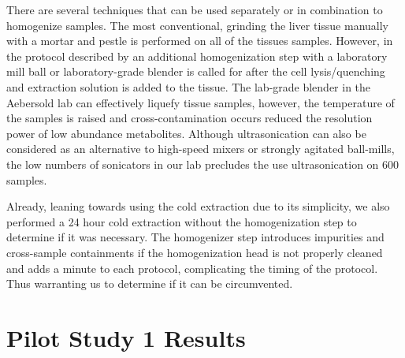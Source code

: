\documentclass[a4paper,11pt,twoside]{book}
\begin{document}
	There are several techniques that can be used separately or in combination to homogenize samples. The most conventional, grinding the liver tissue manually with a mortar and pestle is performed on all of the tissues samples. However, in the protocol described by \citeauthor{Williams2016SystemsFunction} an additional homogenization step with a laboratory mill ball or laboratory-grade blender is called for after the cell lysis/quenching and extraction solution is added to the tissue. The lab-grade blender in the Aebersold lab can effectively liquefy tissue samples, however, the temperature of the samples is raised and cross-contamination occurs reduced the resolution power of low abundance metabolites. Although ultrasonication can also be considered as an alternative to high-speed mixers or strongly agitated ball-mills, the low numbers of sonicators in our lab precludes the use ultrasonication on 600 samples.

	Already, leaning towards using the cold extraction due to its simplicity, we also performed a 24 hour cold extraction without the homogenization step to determine if it was necessary. The homogenizer step introduces impurities and cross-sample containments if the homogenization head is not properly cleaned and adds a minute to each protocol, complicating the timing of the protocol. Thus warranting us to determine if it can be circumvented.
	
	\section{Pilot Study 1 Results}
	
\end{document}
